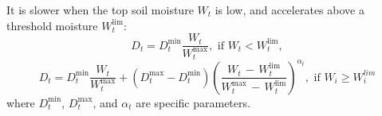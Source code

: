 It is slower when the top soil moisture $W_t$ is low, and accelerates above a threshold moisture $W_t^\mathrm{lim}$: 
\begin{equation}\label{eq:dr1}
D_t = D_t^\mathrm{min}\frac{W_t}{W_t^\mathrm{max}}, \,\, \mathrm{if} \,\, W_t < W_t^\mathrm{lim},
\end{equation}
\begin{equation}\label{eq:dr2}
D_t = D_t^\mathrm{min}\frac{W_t}{W_t^\mathrm{max}} + (D_t^\mathrm{max} - D_t^\mathrm{min})\left(
\frac{W_t \,-\, W_t^\mathrm{lim}}{W_t^\mathrm{max}\, - \,W_t^\mathrm{lim}} \right)^{\alpha_t},
\,\, \mathrm{if}\,\,W_i \geq W_i^{lim}
\end{equation}
where $D_t^\mathrm{min}$, $D_t^\mathrm{max}$, and $\alpha_t$ are specific parameters.